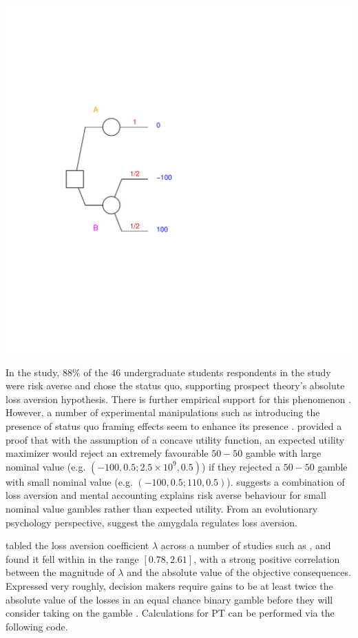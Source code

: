 \documentclass{article}\usepackage[]{graphicx}\usepackage[]{color}
\newenvironment{knitrout}{}{} %
\begin{document}
\begin{knitrout}
{\centering \includegraphics[width=0.8\linewidth]{figure/unnamed-chunk-36} 

}



\end{knitrout}


In the \cite{Erev_2013} study, $88\%$ of the $46$ undergraduate students respondents in the study were risk averse and chose the status quo, supporting prospect theory's absolute loss aversion
hypothesis. There is further empirical support for this phenomenon \citep[see, e.g.][]{Brooks_Zank_2005, Birnbaum_Bahra_2007, Ert_Erev_2008,  McGraw_Larsen_Kahneman_Schkade_2010, Redelmeier_Tversky_1992}. However, a number of experimental manipulations such as introducing the presence of status quo framing effects seem to enhance its presence \citep*{Erev_2013}. \cite{Rabin_2000} provided a proof that with the assumption of a concave utility function, an expected utility maximizer would reject an extremely favourable $50-50$ gamble with large nominal value (e.g. $(-100, 0.5; 2.5 \times 10^9, 0.5)$) if they rejected a $50-50$ gamble with small nominal value (e.g. $(-100, 0.5; 110, 0.5)$). \cite{Rabin_Thaler_2001} suggests a combination of loss aversion and mental accounting explains risk averse behaviour for small nominal value gambles rather than expected utility.
From an evolutionary psychology perspective, \cite{de_Martino_Camerer_Adolphs_Purves_2010} suggest the amygdala regulates loss aversion.

\cite{Erev_2013} tabled the loss aversion coefficient $\lambda$ across a number of studies such as \cite{Kobberling_Wakker_2005, Abdellaoui_Bleichrodt_Paraschiv_2007}, and found it fell within in the range $[0.78, 2.61]$,
with a strong positive correlation between the magnitude of $\lambda$ and the absolute value of the
objective consequences. Expressed very roughly, decision makers require gains to be at least twice the absolute value of the losses in an equal chance binary gamble before they will consider taking on the gamble \cite[see][p. 1053-1054]{Tversky_Kahneman_1991}. Calculations for PT can be performed via the following code.
\end{document}

